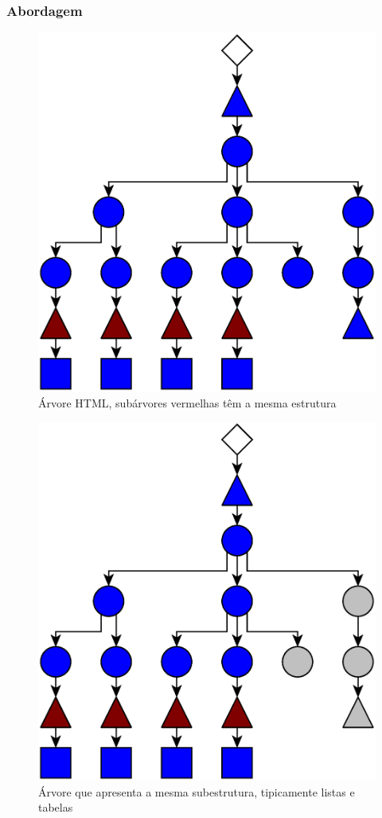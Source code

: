 \documentclass{beamer}
\begin{document}
\begin{frame}[allowframebreaks]
\frametitle{Abordagem}
  \begin{figure}[h]
    \includegraphics[scale=0.25]{img/tree0}
    \caption{Árvore HTML, subárvores vermelhas têm a mesma estrutura}
  \end{figure}

\newpage

  \begin{figure}[h]
    \includegraphics[scale=0.25]{img/tree1}
    \caption{Árvore que apresenta a mesma subestrutura, tipicamente listas e tabelas}
  \end{figure}


\end{frame}
\end{document}
